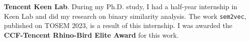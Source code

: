


\textbf{Tencent Keen Lab}.
During my Ph.D. study, I had a half-year internship in Keen Lab and did my
research on binary similarity analysis. The work \texttt{sem2vec}, published
on TOSEM 2023, is a result of this internship.
I was awarded the \textbf{CCF-Tencent Rhino-Bird Elite Award} for this work.
